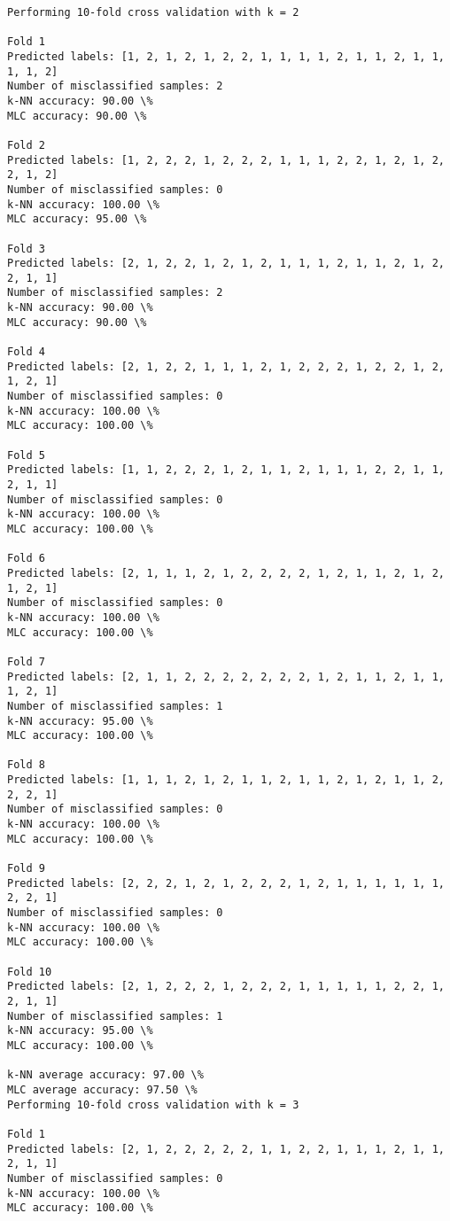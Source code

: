 \documentclass[11pt]{article}
\begin{document}
    \begin{Verbatim}[commandchars=\\\{\}]
Performing 10-fold cross validation with k = 2

Fold 1
Predicted labels: [1, 2, 1, 2, 1, 2, 2, 1, 1, 1, 1, 2, 1, 1, 2, 1, 1, 1, 1, 2]
Number of misclassified samples: 2
k-NN accuracy: 90.00 \%
MLC accuracy: 90.00 \%

Fold 2
Predicted labels: [1, 2, 2, 2, 1, 2, 2, 2, 1, 1, 1, 2, 2, 1, 2, 1, 2, 2, 1, 2]
Number of misclassified samples: 0
k-NN accuracy: 100.00 \%
MLC accuracy: 95.00 \%

Fold 3
Predicted labels: [2, 1, 2, 2, 1, 2, 1, 2, 1, 1, 1, 2, 1, 1, 2, 1, 2, 2, 1, 1]
Number of misclassified samples: 2
k-NN accuracy: 90.00 \%
MLC accuracy: 90.00 \%

Fold 4
Predicted labels: [2, 1, 2, 2, 1, 1, 1, 2, 1, 2, 2, 2, 1, 2, 2, 1, 2, 1, 2, 1]
Number of misclassified samples: 0
k-NN accuracy: 100.00 \%
MLC accuracy: 100.00 \%

Fold 5
Predicted labels: [1, 1, 2, 2, 2, 1, 2, 1, 1, 2, 1, 1, 1, 2, 2, 1, 1, 2, 1, 1]
Number of misclassified samples: 0
k-NN accuracy: 100.00 \%
MLC accuracy: 100.00 \%

Fold 6
Predicted labels: [2, 1, 1, 1, 2, 1, 2, 2, 2, 2, 1, 2, 1, 1, 2, 1, 2, 1, 2, 1]
Number of misclassified samples: 0
k-NN accuracy: 100.00 \%
MLC accuracy: 100.00 \%

Fold 7
Predicted labels: [2, 1, 1, 2, 2, 2, 2, 2, 2, 2, 1, 2, 1, 1, 2, 1, 1, 1, 2, 1]
Number of misclassified samples: 1
k-NN accuracy: 95.00 \%
MLC accuracy: 100.00 \%

Fold 8
Predicted labels: [1, 1, 1, 2, 1, 2, 1, 1, 2, 1, 1, 2, 1, 2, 1, 1, 2, 2, 2, 1]
Number of misclassified samples: 0
k-NN accuracy: 100.00 \%
MLC accuracy: 100.00 \%

Fold 9
Predicted labels: [2, 2, 2, 1, 2, 1, 2, 2, 2, 1, 2, 1, 1, 1, 1, 1, 1, 2, 2, 1]
Number of misclassified samples: 0
k-NN accuracy: 100.00 \%
MLC accuracy: 100.00 \%

Fold 10
Predicted labels: [2, 1, 2, 2, 2, 1, 2, 2, 2, 1, 1, 1, 1, 1, 2, 2, 1, 2, 1, 1]
Number of misclassified samples: 1
k-NN accuracy: 95.00 \%
MLC accuracy: 100.00 \%

k-NN average accuracy: 97.00 \%
MLC average accuracy: 97.50 \%
Performing 10-fold cross validation with k = 3

Fold 1
Predicted labels: [2, 1, 2, 2, 2, 2, 2, 1, 1, 2, 2, 1, 1, 1, 2, 1, 1, 2, 1, 1]
Number of misclassified samples: 0
k-NN accuracy: 100.00 \%
MLC accuracy: 100.00 \%


\end{Verbatim}
\end{document}
